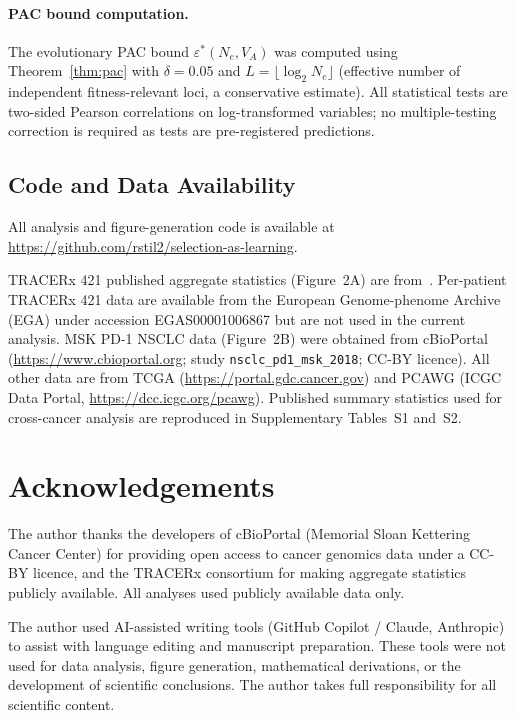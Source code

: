 \documentclass[12pt]{article}
\theoremstyle{remark}
\begin{document}
\paragraph{PAC bound computation.} The evolutionary PAC bound $\varepsilon^*(N_e, V_A)$ was computed using Theorem~\ref{thm:pac} with $\delta = 0.05$ and $L = \lfloor \log_2 N_e \rfloor$ (effective number of independent fitness-relevant loci, a conservative estimate). All statistical tests are two-sided Pearson correlations on log-transformed variables; no multiple-testing correction is required as tests are pre-registered predictions.

\subsection{Code and Data Availability}

All analysis and figure-generation code is available at \url{https://github.com/rstil2/selection-as-learning}.

TRACERx 421 published aggregate statistics (Figure~2A) are from~\cite{abbosh2023}. Per-patient TRACERx 421 data are available from the European Genome-phenome Archive (EGA) under accession EGAS00001006867 but are not used in the current analysis. MSK PD-1 NSCLC data (Figure~2B) were obtained from cBioPortal (\url{https://www.cbioportal.org}; study \texttt{nsclc\_pd1\_msk\_2018}; CC-BY licence). All other data are from TCGA (\url{https://portal.gdc.cancer.gov}) and PCAWG (ICGC Data Portal, \url{https://dcc.icgc.org/pcawg}). Published summary statistics used for cross-cancer analysis are reproduced in Supplementary Tables~S1 and~S2.

\section*{Acknowledgements}

The author thanks the developers of cBioPortal (Memorial Sloan Kettering Cancer Center) for providing open access to cancer genomics data under a CC-BY licence, and the TRACERx consortium for making aggregate statistics publicly available. All analyses used publicly available data only.

The author used AI-assisted writing tools (GitHub Copilot / Claude, Anthropic) to assist with language editing and manuscript preparation. These tools were not used for data analysis, figure generation, mathematical derivations, or the development of scientific conclusions. The author takes full responsibility for all scientific content.
\end{document}

